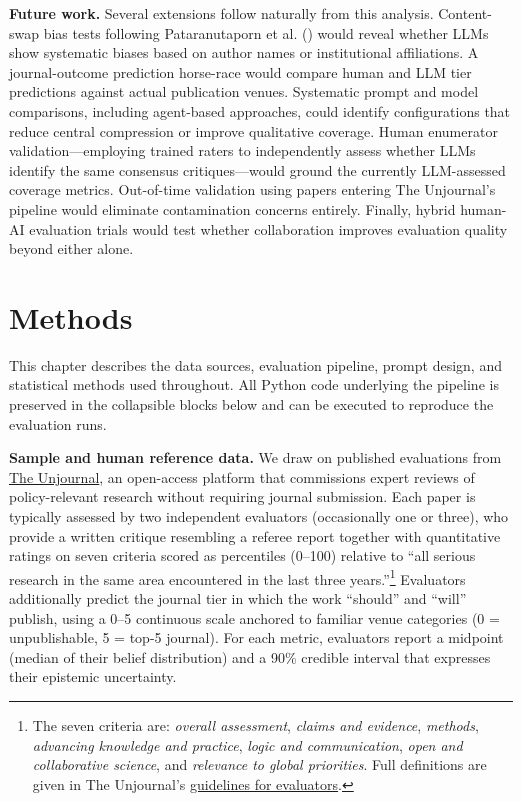 \documentclass[
  11pt,
  letterpaper,
]{article}
\begin{document}
\textbf{Future work.} Several extensions follow naturally from this
analysis. Content-swap bias tests following Pataranutaporn et al.
() would reveal whether LLMs show
systematic biases based on author names or institutional affiliations. A
journal-outcome prediction horse-race would compare human and LLM tier
predictions against actual publication venues. Systematic prompt and
model comparisons, including agent-based approaches, could identify
configurations that reduce central compression or improve qualitative
coverage. Human enumerator validation---employing trained raters to
independently assess whether LLMs identify the same consensus
critiques---would ground the currently LLM-assessed coverage metrics.
Out-of-time validation using papers entering The Unjournal's pipeline
would eliminate contamination concerns entirely. Finally, hybrid
human-AI evaluation trials would test whether collaboration improves
evaluation quality beyond either alone.


\section{Methods}\label{methods}

\small

This chapter describes the data sources, evaluation pipeline, prompt
design, and statistical methods used throughout. All Python code
underlying the pipeline is preserved in the collapsible blocks below and
can be executed to reproduce the evaluation runs.

\textbf{Sample and human reference data.} We draw on published
evaluations from
\href{https://unjournal.github.io/unjournaldata/index.html}{The
Unjournal}, an open-access platform that commissions expert reviews of
policy-relevant research without requiring journal submission. Each
paper is typically assessed by two independent evaluators (occasionally
one or three), who provide a written critique resembling a referee
report together with quantitative ratings on seven criteria scored as
percentiles (0--100) relative to ``all serious research in the same area
encountered in the last three years.''\footnote{The seven criteria are:
  \emph{overall assessment}, \emph{claims and evidence}, \emph{methods},
  \emph{advancing knowledge and practice}, \emph{logic and
  communication}, \emph{open and collaborative science}, and
  \emph{relevance to global priorities}. Full definitions are given in
  The Unjournal's
  \href{https://globalimpact.gitbook.io/the-unjournal-project-and-communication-space/policies-projects-evaluation-workflow/evaluation/guidelines-for-evaluators}{guidelines
  for evaluators}.} Evaluators additionally predict the journal tier in
which the work ``should'' and ``will'' publish, using a 0--5 continuous
scale anchored to familiar venue categories (0 = unpublishable, 5 =
top-5 journal). For each metric, evaluators report a midpoint (median of
their belief distribution) and a 90\% credible interval that expresses
their epistemic uncertainty.
\end{document}
